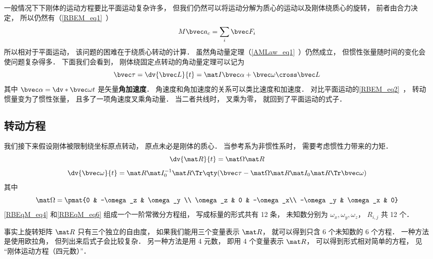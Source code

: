 

一般情况下下刚体的运动方程要比平面运动复杂许多， 但我们仍然可以将运动分解为质心的运动以及刚体绕质心的旋转， 前者由合力决定， 所以仍然有（\autoref{RBEM_eq1}~）
\begin{equation}\label{RBEqM_eq8}
M\bvec a_c = \sum_i \bvec F_i
\end{equation}
所以相对于平面运动， 该问题的困难在于绕质心转动的计算． 虽然角动量定理（\autoref{AMLaw_eq1}~）仍然成立， 但惯性张量随时间的变化会使问题复杂得多． 下面我们会看到， 刚体绕固定点转动的角动量定理可以记为
\begin{equation}
\bvec\tau = \dv{\bvec L}{t} = \mat I \bvec\alpha + \bvec\omega \cross \bvec L
\end{equation}
其中 $\bvec\alpha = \dv*{\bvec\omega}{t}$ 是矢量\textbf{角加速度}． 角速度和角加速度的关系可以类比速度和加速度． 对比平面运动的\autoref{RBEM_eq2}~， 转动惯量变为了惯性张量， 且多了一项角速度叉乘角动量． 当二者共线时， 叉乘为零， 就回到了平面运动的式子．

\subsection{转动方程}
我们接下来假设刚体被限制绕坐标原点转动， 原点未必是刚体的质心． 当参考系为非惯性系时， 需要考虑惯性力带来的力矩． 
\begin{equation}\label{RBEqM_eq4}
\dv{\mat R}{t} = \mat\Omega \mat R
\end{equation}
\begin{equation}\label{RBEqM_eq6}
\dv{\bvec \omega}{t} = \mat R \mat I_0^{-1} \mat R\Tr \qty(\bvec \tau  - \mat \Omega \mat R \mat I_0 \mat R\Tr \bvec\omega)
\end{equation}
其中
\begin{equation}
\mat\Omega = \pmat{0 & -\omega_z & \omega_y \\ \omega_z & 0 & -\omega_x\\ -\omega_y & \omega_x & 0}
\end{equation}
\autoref{RBEqM_eq4} 和\autoref{RBEqM_eq6} 组成一个一阶常微分方程组， 写成标量的形式共有 12 条， 未知数分别为 $\omega_x, \omega_y, \omega_z$， $R_{i,j}$ 共 12 个．

事实上旋转矩阵 $\mat R$ 只有三个独立的自由度， 如果我们能用三个变量表示 $\mat R$， 就可以得到只含 6 个未知数的 6 个方程． 一种方法是使用欧拉角， 但列出来后式子会比较复杂． 另一种方法是用 4 元数， 即用 4 个变量表示 $\mat R$， 可以得到形式相对简单的方程， 见 “刚体运动方程（四元数）”．



